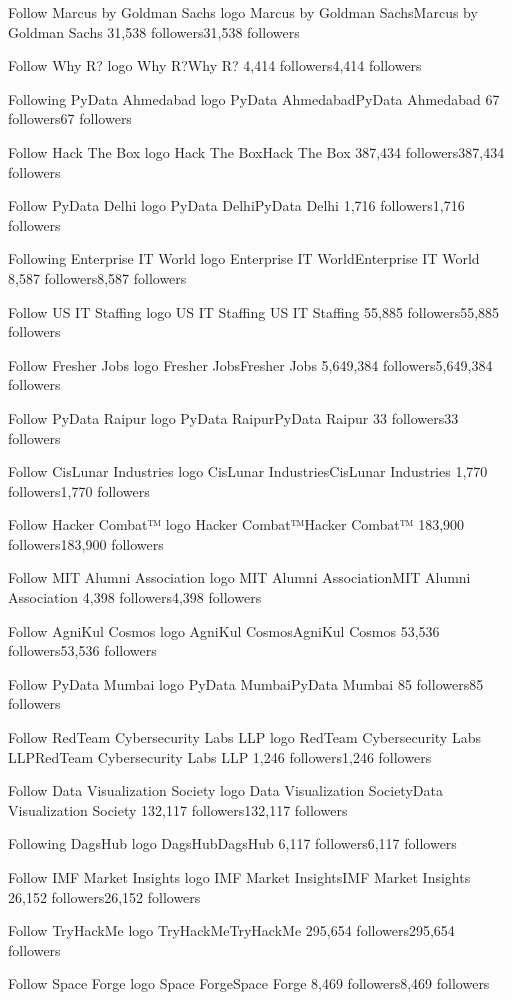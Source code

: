 Follow
Marcus by Goldman Sachs logo
Marcus by Goldman SachsMarcus by Goldman Sachs
31,538 followers31,538 followers

Follow
Why R? logo
Why R?Why R?
4,414 followers4,414 followers

Following
PyData Ahmedabad logo
PyData AhmedabadPyData Ahmedabad
67 followers67 followers

Follow
Hack The Box logo
Hack The BoxHack The Box
387,434 followers387,434 followers

Follow
PyData Delhi logo
PyData DelhiPyData Delhi
1,716 followers1,716 followers

Following
Enterprise IT World logo
Enterprise IT WorldEnterprise IT World
8,587 followers8,587 followers

Follow
US IT Staffing  logo
US IT Staffing US IT Staffing 
55,885 followers55,885 followers

Follow
Fresher Jobs logo
Fresher JobsFresher Jobs
5,649,384 followers5,649,384 followers

Follow
PyData Raipur logo
PyData RaipurPyData Raipur
33 followers33 followers

Follow
CisLunar Industries logo
CisLunar IndustriesCisLunar Industries
1,770 followers1,770 followers

Follow
Hacker Combat™ logo
Hacker Combat™Hacker Combat™
183,900 followers183,900 followers

Follow
MIT Alumni Association logo
MIT Alumni AssociationMIT Alumni Association
4,398 followers4,398 followers

Follow
AgniKul Cosmos logo
AgniKul CosmosAgniKul Cosmos
53,536 followers53,536 followers

Follow
PyData Mumbai logo
PyData MumbaiPyData Mumbai
85 followers85 followers

Follow
RedTeam Cybersecurity Labs LLP logo
RedTeam Cybersecurity Labs LLPRedTeam Cybersecurity Labs LLP
1,246 followers1,246 followers

Follow
Data Visualization Society logo
Data Visualization SocietyData Visualization Society
132,117 followers132,117 followers

Following
DagsHub logo
DagsHubDagsHub
6,117 followers6,117 followers

Follow
IMF Market Insights logo
IMF Market InsightsIMF Market Insights
26,152 followers26,152 followers

Follow
TryHackMe logo
TryHackMeTryHackMe
295,654 followers295,654 followers

Follow
Space Forge logo
Space ForgeSpace Forge
8,469 followers8,469 followers

